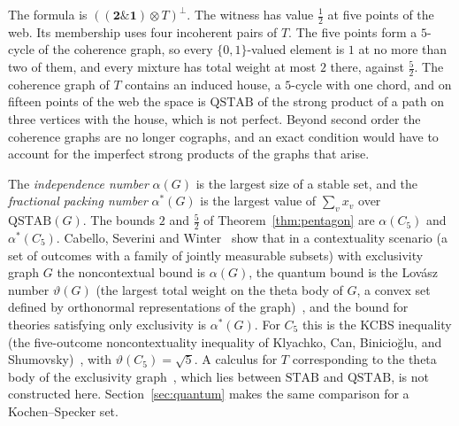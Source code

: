 \noindent
The formula is $((\mathbf{2} \mathbin{\&} \mathbf{1}) \otimes T)^{\perp}$.
The witness has value $\tfrac12$ at five points of the web. Its membership
uses four incoherent pairs of $T$. The five points form a $5$-cycle of the
coherence graph, so every $\{0,1\}$-valued element is $1$ at no more than
two of them, and every mixture has total weight at most $2$ there,
against $\tfrac52$. The coherence graph of $T$ contains an induced house,
a $5$-cycle with one chord, and on fifteen points of the web the space is
$\mathrm{QSTAB}$ of the strong product of a path on three vertices with
the house, which is not perfect. Beyond second order the coherence graphs
are no longer cographs, and an exact condition would have to account for
the imperfect strong products of the graphs that arise.

The \emph{independence number} $\alpha(G)$ is the largest size of a
stable set, and the \emph{fractional packing number} $\alpha^{*}(G)$ is
the largest value of $\sum_v x_v$ over $\mathrm{QSTAB}(G)$. The bounds
$2$ and $\tfrac52$ of Theorem~\ref{thm:pentagon} are $\alpha(C_5)$ and
$\alpha^{*}(C_5)$. Cabello, Severini and Winter~\cite{cabello2014} show
that in a contextuality scenario (a set of outcomes with a family of
jointly measurable subsets) with exclusivity graph $G$ the noncontextual
bound is $\alpha(G)$, the quantum bound is the Lov\'asz number
$\vartheta(G)$ (the largest total weight on the theta body of $G$, a
convex set defined by orthonormal representations of the
graph)~\cite{lovasz1979}, and the bound for theories satisfying only
exclusivity is $\alpha^{*}(G)$. For $C_5$ this is the KCBS
inequality (the five-outcome noncontextuality inequality of Klyachko,
Can, Binicio\u{g}lu, and Shumovsky)~\cite{klyachko2008}, with
$\vartheta(C_5) = \sqrt5$. A calculus for $T$ corresponding to the theta
body of the exclusivity graph~\cite{gls1988}, which lies between $\mathrm{STAB}$ and
$\mathrm{QSTAB}$, is not constructed here. Section~\ref{sec:quantum}
makes the same comparison for a Kochen--Specker set.
